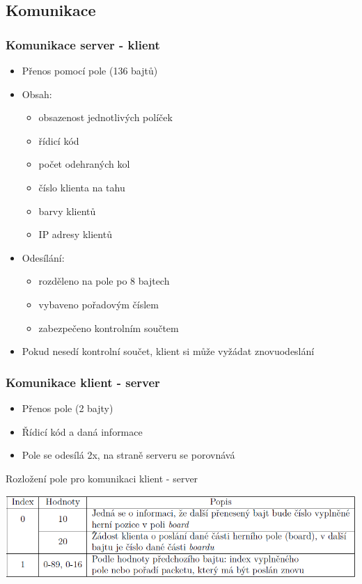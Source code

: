 \documentclass{beamer}
\begin{document}
\subsection{Komunikace}
\begin{frame}
\frametitle{Komunikace server - klient}
\begin{itemize}
	\item Přenos pomocí pole (136 bajtů)
	\item Obsah:
	\begin{itemize}
		\item obsazenost jednotlivých políček
		\item řídicí kód
		\item počet odehraných kol
		\item číslo klienta na tahu
		\item barvy klientů
		\item IP adresy klientů
	\end{itemize}
	 \item Odesílání: 
	 \begin{itemize}
	 	\item rozděleno na pole po 8 bajtech
	 	\item vybaveno pořadovým číslem
	 	\item zabezpečeno kontrolním součtem
	 \end{itemize}
	 \item Pokud nesedí kontrolní součet, klient si může vyžádat znovuodeslání
\end{itemize}
\end{frame}


\begin{frame}
\frametitle{Komunikace klient - server}
\begin{itemize}
	\item Přenos pole (2 bajty)
	\item Řídicí kód a daná informace
	\item Pole se odesílá 2x, na straně serveru se porovnává
\end{itemize}

\begin{table}
	\centering
	\caption{Rozložení pole pro komunikaci klient - server}
	\includegraphics[width=\textwidth]{img/clientComm.png}
\end{table}
\end{frame}
\end{document}
